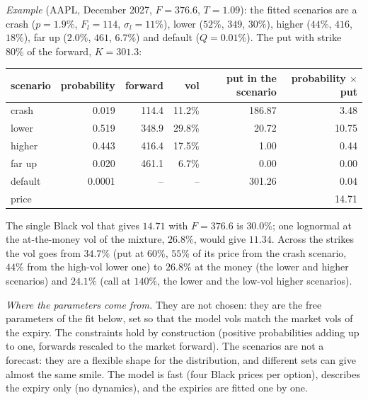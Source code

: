 \emph{Example} (AAPL, December 2027, $F = 376.6$, $T = 1.09$): the fitted scenarios are a crash ($p = 1.9\%$,
$F_l = 114$, $\sigma_l = 11\%$), lower ($52\%$, $349$, $30\%$), higher ($44\%$, $416$, $18\%$), far up ($2.0\%$,
$461$, $6.7\%$) and default ($Q = 0.01\%$). The put with strike $80\%$ of the forward, $K = 301.3$:
\begin{center}
\begin{tabular}{lrrrrr}
  \toprule
  scenario & probability & forward & vol & put in the scenario & probability $\times$ put \\
  \midrule
  crash & 0.019 & 114.4 & 11.2\% & 186.87 & 3.48 \\
  lower & 0.519 & 348.9 & 29.8\% & 20.72 & 10.75 \\
  higher & 0.443 & 416.4 & 17.5\% & 1.00 & 0.44 \\
  far up & 0.020 & 461.1 & 6.7\% & 0.00 & 0.00 \\
  default & 0.0001 & -- & -- & 301.26 & 0.04 \\
  \midrule
  \multicolumn{5}{l}{price} & 14.71 \\
  \bottomrule
\end{tabular}
\end{center}
The single Black vol that gives $14.71$ with $F = 376.6$ is $30.0\%$; one lognormal at the at-the-money vol of the
mixture, $26.8\%$, would give $11.34$. Across the strikes the vol goes from $34.7\%$ (put at $60\%$, $55\%$ of its
price from the crash scenario, $44\%$ from the high-vol lower one) to $26.8\%$ at the money (the lower and higher
scenarios) and $24.1\%$ (call at $140\%$, the lower and the low-vol higher scenarios).

\emph{Where the parameters come from.} They are not chosen: they are the free parameters of the fit below, set so
that the model vols match the market vols of the expiry. The constraints hold by construction (positive
probabilities adding up to one, forwards rescaled to the market forward). The scenarios are not a forecast: they are
a flexible shape for the distribution, and different sets can give almost the same smile. The model is fast (four
Black prices per option), describes the expiry only (no dynamics), and the expiries are fitted one by one.

